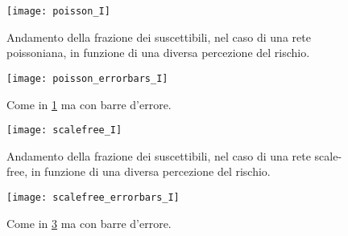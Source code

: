 \begin{figure}
		\begin{center}
			\texttt{[image: poisson\_I]}
			\caption{Andamento della frazione dei suscettibili, nel caso di una rete poissoniana, in funzione di una diversa percezione del rischio.}
			\label{fig:sim_poisson}
		\end{center}
\end{figure}
%
\begin{figure}
		\begin{center}
			\texttt{[image: poisson\_errorbars\_I]}
			\caption{Come in \cref{fig:sim_poisson} ma con barre d'errore.}
			\label{fig:sim_poisson2}
		\end{center}
\end{figure}
%
\begin{figure}
		\begin{center}
			\texttt{[image: scalefree\_I]}
			\caption{Andamento della frazione dei suscettibili, nel caso di una rete scale-free, in funzione di una diversa percezione del rischio.}
			\label{fig:sim_scalefree}
		\end{center}
\end{figure}	
%
\begin{figure}
		\begin{center}
			\texttt{[image: scalefree\_errorbars\_I]}
			\caption{Come in \cref{fig:sim_scalefree} ma con barre d'errore.}
			\label{fig:sim_scalefree2}
		\end{center}
\end{figure}	

